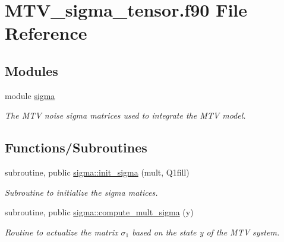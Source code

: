 \hypertarget{MTV__sigma__tensor_8f90}{}\section{M\+T\+V\+\_\+sigma\+\_\+tensor.\+f90 File Reference}
\label{MTV__sigma__tensor_8f90}
\subsection*{Modules}
\begin{DoxyCompactItemize}
\item 
module \hyperlink{namespacesigma}{sigma}
\begin{DoxyCompactList}\small\item\em The M\+TV noise sigma matrices used to integrate the M\+TV model. \end{DoxyCompactList}\end{DoxyCompactItemize}
\subsection*{Functions/\+Subroutines}
\begin{DoxyCompactItemize}
\item 
subroutine, public \hyperlink{namespacesigma_a740d1f7a96c6b4c8a902fcc8113b29a9}{sigma\+::init\+\_\+sigma} (mult, Q1fill)
\begin{DoxyCompactList}\small\item\em Subroutine to initialize the sigma matices. \end{DoxyCompactList}\item 
subroutine, public \hyperlink{namespacesigma_ac61cf00c42223c0bf14e37eb00b3259c}{sigma\+::compute\+\_\+mult\+\_\+sigma} (y)
\begin{DoxyCompactList}\small\item\em Routine to actualize the matrix $\sigma_1$ based on the state y of the M\+TV system. \end{DoxyCompactList}\end{DoxyCompactItemize}
